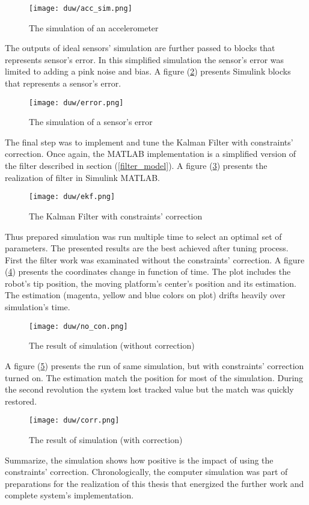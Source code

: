 \begin{figure}[!h]
	\centering
	\texttt{[image: duw/acc\_sim.png]}
	\caption{The simulation of an accelerometer}
	\label{acc_sym}
\end{figure}

The outputs of ideal sensors' simulation are further passed to blocks that represents sensor's error. In this simplified simulation the sensor's error was limited to adding a pink noise and bias. A figure (\ref{error_sensor}) presents Simulink blocks that represents a sensor's error.

\begin{figure}[!h]
	\centering
	\texttt{[image: duw/error.png]}
	\caption{The simulation of a sensor's error}
	\label{error_sensor}
\end{figure}

The final step was to implement and tune the Kalman Filter with constraints' correction. Once again, the MATLAB implementation is a simplified version of the filter described in section (\ref{filter_model}). A figure (\ref{ekf_sim}) presents the realization of filter in Simulink MATLAB.

\begin{figure}[!h]
	\centering
	\texttt{[image: duw/ekf.png]}
	\caption{The Kalman Filter with constraints' correction}
	\label{ekf_sim}
\end{figure}

Thus prepared simulation was run multiple time to select an optimal set of parameters. The presented results are the best achieved after tuning process. First the filter work was examinated without the constraints' correction. A figure (\ref{no_con}) presents the coordinates change in function of time. The plot includes the robot's tip position, the moving platform's center's position and its estimation. The estimation (magenta, yellow and blue colors on plot) drifts heavily over simulation's time.

\begin{figure}[!h]
	\centering
	\texttt{[image: duw/no\_con.png]}
	\caption{The result of simulation (without correction)}
	\label{no_con}
\end{figure}

A figure (\ref{corr}) presents the run of same simulation, but with constraints' correction turned on. 
The estimation match the position for most of the simulation. During the second revolution the system lost tracked value but the match was quickly restored.

\begin{figure}[!h]
	\centering
	\texttt{[image: duw/corr.png]}
	\caption{The result of simulation (with correction)}
	\label{corr}
\end{figure}

\newpage
Summarize, the simulation shows how positive is the impact of using the constraints' correction. Chronologically, the computer simulation was part of preparations for the realization of this thesis that energized the further work and complete system's implementation.